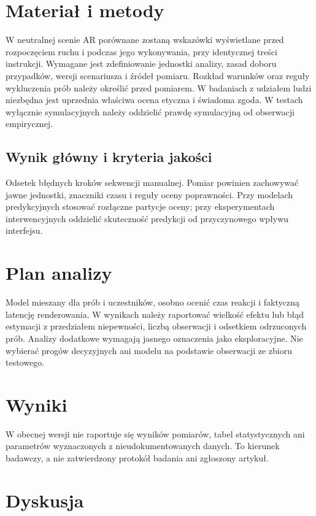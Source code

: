\documentclass[11pt,a4paper]{article}
\begin{document}
\section{Materiał i metody}

W neutralnej scenie AR porównane zostaną wskazówki wyświetlane przed rozpoczęciem ruchu i podczas jego wykonywania, przy identycznej treści instrukcji. Wymagane jest zdefiniowanie jednostki analizy, zasad doboru przypadków, wersji scenariusza i źródeł pomiaru. Rozkład warunków oraz reguły wykluczenia prób należy określić przed pomiarem. W badaniach z udziałem ludzi niezbędna jest uprzednia właściwa ocena etyczna i świadoma zgoda. W testach wyłącznie symulacyjnych należy oddzielić prawdę symulacyjną od obserwacji empirycznej.

\subsection{Wynik główny i kryteria jakości}

Odsetek błędnych kroków sekwencji manualnej. Pomiar powinien zachowywać jawne jednostki, znaczniki czasu i reguły oceny poprawności. Przy modelach predykcyjnych stosować rozłączne partycje oceny; przy eksperymentach interwencyjnych oddzielić skuteczność predykcji od przyczynowego wpływu interfejsu.

\section{Plan analizy}

Model mieszany dla prób i uczestników, osobno ocenić czas reakcji i faktyczną latencję renderowania. W wynikach należy raportować wielkość efektu lub błąd estymacji z przedziałem niepewności, liczbą obserwacji i odsetkiem odrzuconych prób. Analizy dodatkowe wymagają jasnego oznaczenia jako eksploracyjne. Nie wybierać progów decyzyjnych ani modelu na podstawie obserwacji ze zbioru testowego.

\section{Wyniki}

W obecnej wersji nie raportuje się wyników pomiarów, tabel statystycznych ani parametrów wyznaczonych z nieudokumentowanych danych. To kierunek badawczy, a nie zatwierdzony protokół badania ani zgłoszony artykuł.

\section{Dyskusja}
\end{document}

